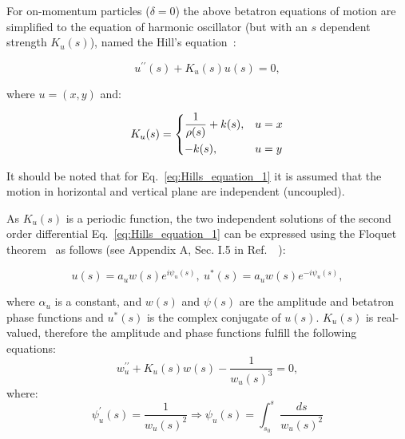 For on-momentum particles ($\delta = 0$) the above betatron equations of motion are simplified to the equation of harmonic oscillator (but with an $s$ dependent strength $K_u(s)$), named the Hill's equation~\cite{Lee:1425444}:

\begin{equation}\label{eq:Hills_equation_1}
    u^{\prime \prime}(s) + K_u(s) u(s) = 0,
\end{equation}

where $u=(x,y)$ and:

 \begin{equation}\label{eq:Hills_equation_2}
    K_u(s) = \begin{dcases}
        \frac{1}{\rho(s)}+k(s), & u=x \\
        -k(s), & u=y 
    \end{dcases}
\end{equation}

It should be noted that for Eq.~\eqref{eq:Hills_equation_1} it is assumed that the motion in horizontal and vertical plane are independent (uncoupled).

As $K_u(s)$ is a periodic function, the two independent solutions of the second order differential Eq.~\eqref{eq:Hills_equation_1} can be expressed using the Floquet theorem~\cite{Floquet1883} as follows (see Appendix A, Sec. I.5 in Ref.~~\cite{Lee:1425444}):

\begin{equation}\label{eq:Floquets_solutions}
    u(s) = a_u w(s)e^{i \psi_u (s)}, \ u^*(s) = a_u w(s)e^{-i \psi_u (s)},
\end{equation}

where $\alpha_u$ is a constant, and $w(s)$ and $\psi(s)$ are the amplitude and betatron phase functions and $u^*(s)$ is the complex conjugate of $u(s)$. 
$K_u(s)$ is real-valued, therefore the amplitude and phase functions fulfill the following equations: %
\begin{equation}\label{eq:phase_functions}
    w^{\prime \prime}_u + K_u(s) w(s) -\frac{1}{w_u(s)^3} = 0, 
\end{equation}
where:
\begin{equation}\label{eq:phase_function}
    \psi^{\prime}_u(s) = \frac{1}{w_u(s)^2} \Rightarrow \psi_u(s) = \int_{s_0}^{s} \frac{ds}{w_u(s)^2}
\end{equation}

